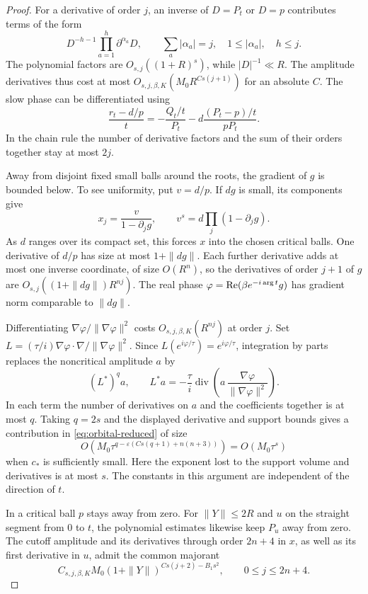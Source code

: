 \begin{proof}
For a derivative of order \(j\), an inverse of \(D=P_t\) or
\(D=p\) contributes terms of the form
\[
 D^{-h-1}\prod_{a=1}^{h}\partial^{\alpha_a}D,
 \qquad \sum_a|\alpha_a|=j,\quad 1\le|\alpha_a|,\quad h\le j .
\]
The polynomial factors are \(O_{s,j}((1+R)^s)\), while
\(|D|^{-1}\ll R\). The amplitude derivatives thus cost at most
\(O_{s,j,\beta,K}(M_0R^{Cs(j+1)})\) for an absolute \(C\). The slow phase
can be differentiated using
\[
 \frac{r_t-d/p}{t}=-\frac{Q_t/t}{P_t}
                    -d\frac{(P_t-p)/t}{pP_t}.
\]
In the chain rule the number of derivative factors and the sum
of their orders together stay at most \(2j\).


Away from disjoint fixed small balls around the roots, the
gradient of \(g\) is bounded below. To see uniformity, put
\(v=d/p\). If \(dg\) is small, its components give
\[
 x_j=\frac{v}{1-\partial_jg},\qquad v^s=d\prod_j(1-\partial_jg).
\]
As \(d\) ranges over its compact set, this forces \(x\) into the
chosen critical balls. One derivative of \(d/p\) has size at most
\(1+\|dg\|\). Each further derivative adds at most one inverse
coordinate, of size \(O(R^n)\), so the derivatives of order \(j+1\)
of \(g\) are \(O_{s,j}((1+\|dg\|)R^{nj})\). The real phase
\(\varphi=\operatorname{Re}(\beta e^{-i\arg t}g)\) has gradient norm
comparable to \(\|dg\|\).

Differentiating
\(\nabla\varphi/\|\nabla\varphi\|^2\) costs \(O_{s,j,\beta,K}(R^{nj})\)
at order \(j\). Set \(L=(\tau/i)\nabla\varphi\cdot\nabla/\|\nabla\varphi\|^2\).
Since \(L(e^{i\varphi/\tau})=e^{i\varphi/\tau}\), integration
by parts replaces the noncritical amplitude \(a\) by
\[
 (L^*)^q a,\qquad
 L^*a=-\frac{\tau}{i}\operatorname{div}
             \left(a\,\frac{\nabla\varphi}{\|\nabla\varphi\|^2}\right).
\]
In each term the number of derivatives on \(a\) and the
coefficients together is at most \(q\). Taking \(q=2s\) and the
displayed derivative and support bounds gives
a contribution in \eqref{eq:orbital-reduced} of size
\[
 O\!\left(M_0\tau^{q-\varepsilon(Cs(q+1)+n(n+3))}\right)
       =O(M_0\tau^s)
\]
when \(c_*\) is sufficiently small. Here the exponent lost to the
support volume and derivatives is at most \(s\). The
constants in this argument are independent of the direction of \(t\).


In a critical ball \(p\) stays away from zero. For \(\|Y\|\le2R\)
and \(u\) on the straight segment from \(0\) to \(t\), the polynomial
estimates likewise keep \(P_u\) away from zero. The cutoff amplitude
and its derivatives through order \(2n+4\) in \(x\), as well as
its first derivative in \(u\), admit the common majorant
\[
 C_{s,j,\beta,K}M_0(1+\|Y\|)^{Cs(j+2)-B_1s^2},
 \qquad 0\le j\le 2n+4 .
\]


\end{proof}
